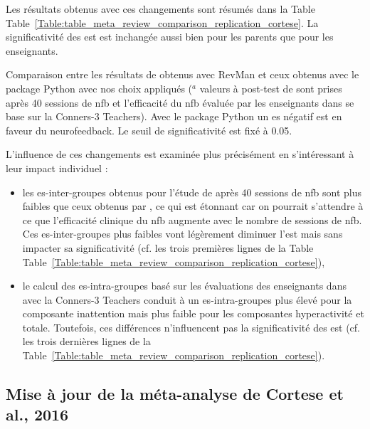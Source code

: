 Les résultats obtenus avec ces changements sont résumés dans la Table Table~\ref{Table:table_meta_review_comparison_replication_cortese}.
La significativité des \gls{est} est inchangée aussi bien pour les parents que pour les enseignants.

\begin{table}[h!]
  \centering
  \caption{Comparaison entre les résultats de \citet{Cortese2016} obtenus avec RevMan \citep{Revman} et ceux obtenus avec le package Python \citep{Bussalb2019clinical}
	avec nos choix appliqués ($^a$ valeurs à post-test de \citet{Arnold2014} sont prises après 40 sessions de \gls{nfb} et l'efficacité du \gls{nfb} évaluée 
	par les enseignants dans \citet{Steiner2014} se base sur la Conners-3 Teachers).
	Avec le package Python un \gls{es} négatif est en faveur du neurofeedback. Le seuil de significativité est fixé à 0.05.}
  
  \label{Table:table_meta_review_comparison_replication_cortese}
\end{table}

L'influence de ces changements est examinée plus précisément en s'intéressant à leur impact individuel :
\begin{itemize}
\item les \gls{es}-inter-groupes obtenus pour l'étude de \citet{Arnold2014} après 40 sessions de \gls{nfb} sont plus faibles que ceux obtenus 
par \citet{Cortese2016}, ce qui est étonnant car on pourrait s'attendre à ce que l'efficacité clinique du \gls{nfb} augmente avec le nombre de
sessions de \gls{nfb}. Ces \gls{es}-inter-groupes plus faibles vont légèrement diminuer l'\gls{est} mais sans impacter sa significativité 
(cf. les trois premières lignes de la Table Table~\ref{Table:table_meta_review_comparison_replication_cortese}),
\item le calcul des \gls{es}-intra-groupes basé sur les évaluations des enseignants dans \citet{Steiner2014} avec la Conners-3 Teachers
conduit à un \gls{es}-intra-groupes plus élevé pour la composante inattention mais plus faible pour les composantes hyperactivité et totale. Toutefois, ces
différences n'influencent pas la significativité des \gls{est} (cf. les trois dernières lignes de la 
Table~\ref{Table:table_meta_review_comparison_replication_cortese}). 
\end{itemize}

\subsection{Mise à jour de la méta-analyse de Cortese et al., 2016} \label{selection_studies}

